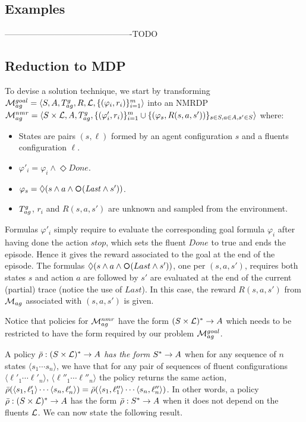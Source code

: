 \subsection{Examples}
----------------------------------------------TODO

\subsection{Reduction to MDP}
To devise a solution technique, we start by transforming
$\mathcal{M}_{ag}^{goal}= \langle S, A, T_{ag}^{g}, R, \mathcal{L},
\{(\varphi_i,r_i)\}_{i=1}^{m} \rangle$ into an NMRDP $\mathcal{M}_{ag}^{nmr} = \langle S\times \mathcal{L}, A, T_{ag}^{g}, \{(\varphi'_i,r_i)\}_{i=1}^{m} \cup \{(\varphi_s, R(s,a, s'))\}_{s\in S, a\in
	A, s'\in S} \rangle$ where:
\begin{itemize}
	\item States are pairs $(s,\ell)$  formed by an agent configuration $s$ and a fluents configuration $\ell$.
	\item $\varphi'_i = \varphi_i \land \Diamond Done$.
	\item $\varphi_s = \Diamond(s\land a\land \Next(\Last \land s'))$.
	\item $T_{ag}^{g}$, $r_i$ and  $R(s,a, s')$ are unknown and sampled from the environment.
\end{itemize} 

Formulas $\varphi'_i$ simply require to evaluate the corresponding
goal formula $\varphi_i$ after having done the action $stop$, which
sets the fluent $Done$ to true and ends the episode. Hence it gives
the reward associated to the goal at the end of the episode.
The formulas $\Diamond(s\land a\land \Next(Last \land s'))$, one per
$(s,a,s')$, requires both states $s$ and action $a$ are followed by
$s'$ are evaluated at the end of the current (partial) trace (notice
the use of $Last$).  In this case, the reward $R(s,a,s')$ from
$\mathcal{M}_{ag}$ associated with $ (s,a,s')$ is given.  


Notice that policies for $\mathcal{M}_{ag}^{nmr}$ have the form
$(S\times\mathcal{L})^*\rightarrow A$ which needs to be restricted to have the form required by our problem
$\mathcal{M}_{ag}^{goal}$.



A policy $\bar{\rho}:(S\times\mathcal{L})^*\rightarrow A$ \emph{has the form} $S^*\rightarrow A$
when for any sequence of $n$ states
$\langle s_1 \cdots s_n\rangle$,
we have that 
for any pair of sequences of fluent configurations 
$\langle \ell'_1 \cdots \ell'_n\rangle$, 
$\langle \ell''_1 \cdots \ell''_n\rangle$
the policy returns the same action, 
$\bar{\rho}(\langle s_1,\ell'_1\rangle \cdots \langle s_n,\ell'_n\rangle) = \bar{\rho}(\langle s_1,\ell''_1\rangle \cdots \langle s_n,\ell''_n\rangle)$.
In other words, a policy  $\bar{\rho}:(S\times\mathcal{L})^*\rightarrow A$ has the form $\bar{\rho}:S^*\rightarrow A$ when it does not depend on the fluents $\mathcal{L}$. 
We can now state the following result.


